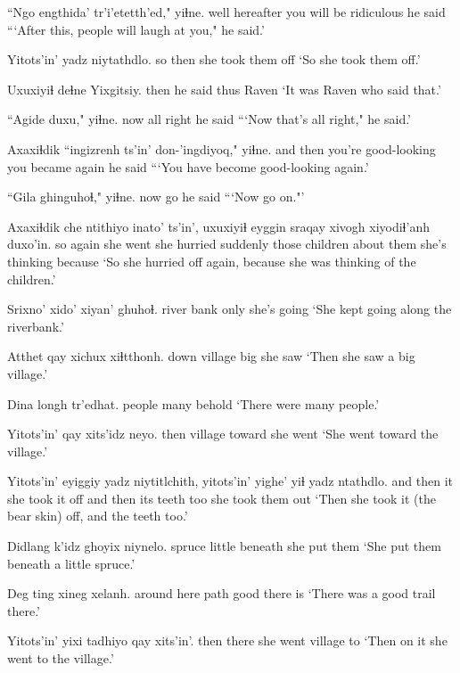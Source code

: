 \documentclass[12pt]{article}
\begin{document}
\gll ``Ngo engthida' tr'i'etetth'ed," yiɬne.
well hereafter {you will be ridiculous} {he said}
\glt ```After this, people will laugh at you," he said.'
\glend 

\gll Yitots'in' {yadz niytathdlo.}
{so then}  {she took them off}
\glt `So she took them off.'
\glend 

\gll Uxuxiyiɬ deɬne  Yixgitsiy.
then  {he said thus} Raven
\glt `It was Raven who said that.'
\glend 

\gll ``Agide duxu," yiɬne.
now {all right} {he said}
\glt ```Now that's all right," he said.'
\glend 

\gll Axaxiɬdik ``ingizrenh ts'in' don-'ingdiyoq,"  yiɬne.
{and then} {you're good-looking} {} {you became again} {he said}
\glt ```You have become good-looking again.'
\glend 

\gll ``Gila ghinguhoɬ," yiɬne.
now go  {he said}
\glt ```Now go on."'
\glend 

\gll Axaxiɬdik che ntithiyo inato' ts'in', uxuxiyiɬ eyggin sraqay  xivogh xiyodiɬ'anh duxo'in.
so  again {she went} {she hurried} {} suddenly those  children {about them} {she's thinking} because
\glt `So she hurried off again, because she was thinking of the children.'
\glend 

\gll Srixno' xido'  xiyan' ghuhoɬ.
river  bank  only  {she's going}
\glt `She kept going along the riverbank.'
\glend 

\gll Atthet qay xichux xiɬtthonh.
down village big  {she saw}
\glt `Then she saw a big village.'
\glend 

\gll Dina longh tr'edhat.
people many behold
\glt `There were many people.'
\glend 

\gll Yitots'in' qay xits'idz neyo.
then  village toward  {she went}
\glt `She went toward the village.'
\glend 

\gll Yitots'in' eyiggiy  {yadz niytitlchith,} yitots'in' yighe'  yiɬ {yadz ntathdlo.}
{and then} it  {she took it off} {and then}  {its teeth} too {she took them out}
\glt `Then she took it (the bear skin) off, and the teeth too.'
\glend 

\gll Didlang k'idz ghoyix niynelo.
spruce  little beneath {she put them}
\glt `She put them beneath a little spruce.'
\glend 

\gll Deg ting xineg  xelanh.
{around here} path good  {there is}
\glt `There was a good trail there.'
\glend 

\gll Yitots'in' yixi tadhiyo qay xits'in'.
then  there {she went} village to
\glt `Then on it she went to the village.'
\glend 
\end{document}

